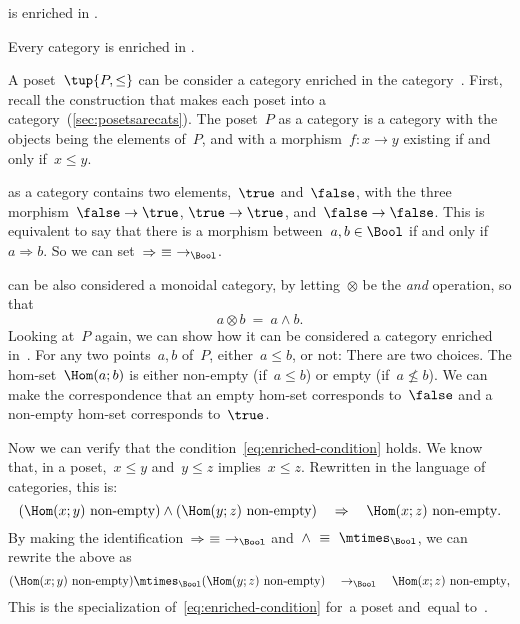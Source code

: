 \begin{example}
  \Category is enriched in \Category.
\end{example}

\begin{example}
  Every category is enriched in \Set.
\end{example}


\begin{example}
  A poset~$\tup{P, \leq}$ can be consider a category enriched in the
  category~\Bool. First, recall the construction that makes each poset into a
  category~(\cref{sec:posetsarecats}). The poset~$P$ as a category is a category with the objects being the
  elements of~$P$, and with a morphism~$f\colon x \to y$ existing if and only if~$x\leq y$.

  \Bool as a category contains two elements,~$\true$ and~$\false$, with
  the three morphism~$\false \to \true$, $\true \to \true$, and~$\false \to \false$. This is equivalent to say that there is a morphism between~$a, b \in \Bool$ if and only if~$a \Rightarrow b$. So we can set~$\Rightarrow\ \equiv\ \to_{\Bool}$.

  \Bool can be also considered a monoidal category, by letting~$\otimes$ be
  the \emph{and} operation, so that
  \begin{equation}
    a \otimes b\ =\ a \wedge b.
  \end{equation}
  Looking at~$P$ again, we can show how it can be considered a category enriched in~\Bool. For any two points~$a, b$ of~$P$, either~$a \leq b$, or not: There are two choices. The hom-set~$\Hom(a; b)$ is either non-empty
  (if~$a \leq b$) or empty (if~$a \not\leq b$). We can make the correspondence that an empty hom-set corresponds to~$\false$ and a non-empty hom-set corresponds to~$\true$.

  Now we can verify that the condition~\cref{eq:enriched-condition} holds. We
  know that, in a poset,~$x \leq y$ and~$y \leq z$ implies~$x \leq z$.
%
  Rewritten in the language of categories, this is:
  \begin{equation*}
  (\Hom(x;y)\ \text{non-empty})
    \wedge
    (\Hom(y; z)\ \text{non-empty})
    \quad
    \Rightarrow
    \quad
    \Hom(x; z)\ \text{non-empty}.
  \end{equation*}
  By making the identification~$\Rightarrow\ \equiv\ \to_{\Bool}$ and~$\wedge\ \equiv\ \mtimes_{\Bool}$, we can rewrite the above as
  \begin{equation*}
  (\Hom(x;y)\ \text{non-empty})
    \mtimes_{\Bool}
    (\Hom(y; z)\ \text{non-empty})
    \quad
    \to_{\Bool}
    \quad
    \Hom(x; z)\ \text{non-empty},
  \end{equation*}
  This is the specialization of~\cref{eq:enriched-condition}
  for~\CatC a poset and~\CatD equal to~\Bool.
\end{example}


